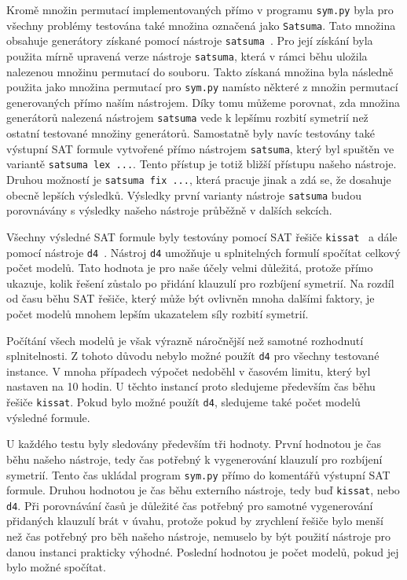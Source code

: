 Kromě množin permutací implementovaných přímo v programu \texttt{sym.py} byla
pro všechny problémy testována také množina označená jako \texttt{Satsuma}. Tato
množina obsahuje generátory získané pomocí nástroje \texttt{satsuma}~\cite{DBLP:journals/corr/abs-2406-13557}.
Pro její získání byla použita mírně upravená verze nástroje \texttt{satsuma}, která
v rámci běhu uložila nalezenou množinu permutací do souboru. Takto získaná
množina byla následně použita jako množina permutací pro \texttt{sym.py} namísto některé z množin
permutací generovaných přímo naším nástrojem. Díky tomu můžeme porovnat,
zda množina generátorů nalezená nástrojem \texttt{satsuma} vede k lepšímu rozbití
symetrií než ostatní testované množiny generátorů. Samostatně byly navíc testovány
také výstupní SAT formule vytvořené přímo nástrojem \texttt{satsuma}, který byl spuštěn ve variantě \texttt{satsuma lex ...}. Tento přístup je totiž bližší přístupu našeho nástroje. Druhou možností je \texttt{satsuma fix ...}, která pracuje jinak a zdá se, že dosahuje obecně lepších výsledků. Výsledky první varianty nástroje \texttt{satsuma} budou porovnávány s výsledky našeho nástroje průběžně v dalších sekcích.

Všechny výsledné SAT formule byly testovány pomocí SAT řešiče \texttt{kissat}~\cite{kissat}
a dále pomocí nástroje \texttt{d4}~\cite{d4}. Nástroj \texttt{d4}
umožňuje u splnitelných formulí spočítat celkový počet modelů. Tato hodnota
je pro naše účely velmi důležitá, protože přímo ukazuje, kolik řešení zůstalo po
přidání klauzulí pro rozbíjení symetrií. Na rozdíl od času běhu SAT řešiče, který
může být ovlivněn mnoha dalšími faktory, je počet modelů mnohem lepším
ukazatelem síly rozbití symetrií.

Počítání všech modelů je však výrazně náročnější než samotné rozhodnutí
splnitelnosti. Z tohoto důvodu nebylo možné použít \texttt{d4} pro všechny testované
instance. V mnoha případech výpočet nedoběhl v časovém limitu, který byl nastaven
na 10 hodin. U těchto instancí proto sledujeme především čas běhu řešiče
\texttt{kissat}. Pokud bylo možné použít \texttt{d4}, sledujeme také počet modelů
výsledné formule.

U každého testu byly sledovány především tři hodnoty. První hodnotou je
čas běhu našeho nástroje, tedy čas potřebný k vygenerování klauzulí pro rozbíjení
symetrií. Tento čas ukládal program \texttt{sym.py} přímo do komentářů výstupní
SAT formule. Druhou hodnotou je čas běhu externího nástroje, tedy buď
\texttt{kissat}, nebo \texttt{d4}. Při porovnávání časů je důležité čas potřebný pro samotné vygenerování přidaných klauzulí brát v úvahu, protože pokud
by zrychlení řešiče bylo menší než čas potřebný pro běh našeho nástroje, nemuselo
by být použití nástroje pro danou instanci prakticky výhodné. Poslední hodnotou je počet modelů, pokud jej bylo možné
spočítat.

